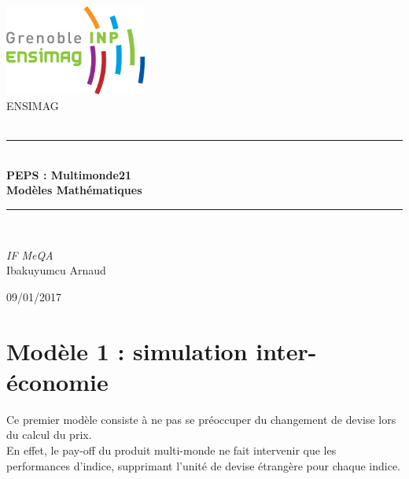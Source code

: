 \documentclass[a4paper,12pt]{article}
\newcommand{\HRule}{\rule{\linewidth}{0.5mm}} %
\begin{document}
\begin{titlepage}
\begin{center}

\includegraphics[width=0.35\textwidth]{logo}~\\[2.5cm] %

\textsc{\LARGE ENSIMAG}\\[1.5cm]
\textsc{\Large }\\[0.5cm]

\HRule \\[0.4cm]

{\huge \bfseries PEPS : Multimonde21\\[0.5cm]
Modèles Mathématiques\\[0.4cm] }

\HRule \\[1.5cm]

\begin{minipage}{0.4\textwidth}
\begin{center} \large
\emph{IF MeQA}\\[2cm]
Ibakuyumcu Arnaud
\end{center}
\end{minipage}
\begin{minipage}{0.4\textwidth}
\end{minipage}

\vfill

\large {09/01/2017 }

\end{center}

\end{titlepage}
 \newpage


 \tableofcontents %
 \newpage


\section{Modèle 1 : simulation inter-économie}
Ce premier modèle consiste à ne pas se préoccuper du changement de devise lors du calcul du prix. \\
En effet, le pay-off du produit multi-monde ne fait intervenir que les performances d'indice, supprimant l'unité de devise étrangère pour chaque indice.
\end{document}
